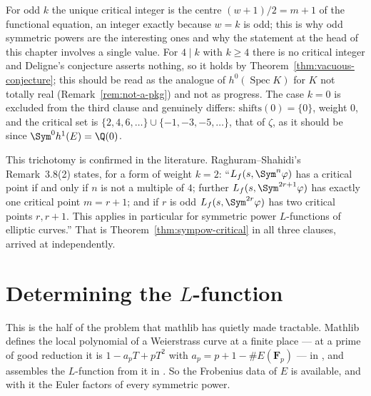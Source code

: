 \begin{remark}
  \label{rem:sympow-trichotomy}
  For odd $k$ the unique critical integer is the centre $(w+1)/2 = m+1$ of the functional
  equation, an integer exactly because $w=k$ is odd; this is why odd symmetric powers are the
  interesting ones and why the statement at the head of this chapter involves a single value.
  For $4 \mid k$ with $k \geq 4$ there is no critical integer and Deligne's conjecture asserts
  nothing, so it holds by Theorem~\ref{thm:vacuous-conjecture}; this should be read as the
  analogue of $h^{0}(\operatorname{Spec}K)$ for $K$ not totally real
  (Remark~\ref{rem:not-a-pkg}) and not as progress. The case $k=0$ is excluded from the
  third clause and genuinely differs: $\mathrm{shifts}(0)=\{0\}$, weight $0$, and the critical
  set is $\{2,4,6,\dots\}\cup\{-1,-3,-5,\dots\}$, that of $\zeta$, as it should be since
  $\Sym^{0}h^{1}(E) = \Q(0)$.

  This trichotomy is confirmed in the literature. Raghuram--Shahidi's Remark~3.8(2) states,
  for a form of weight $k=2$: ``$L_{f}(s,\Sym^{n}\varphi)$ has a critical point if and only if
  $n$ is not a multiple of $4$; further $L_{f}(s,\Sym^{2r+1}\varphi)$ has exactly one critical
  point $m=r+1$; and if $r$ is odd $L_{f}(s,\Sym^{2r}\varphi)$ has two critical points
  $r,r+1$. This applies in particular for symmetric power $L$-functions of elliptic curves.''
  That is Theorem~\ref{thm:sympow-critical} in all three clauses, arrived at independently.
\end{remark}

\section{Determining the \texorpdfstring{$L$}{L}-function}
\label{sec:sympow-L}

This is the half of the problem that mathlib has quietly made tractable. Mathlib defines the
local polynomial of a Weierstrass curve at a finite place --- at a prime of good reduction it
is $1 - a_{p}T + pT^{2}$ with $a_{p} = p + 1 - \#E(\mathbf{F}_{p})$ --- in
, and assembles the $L$-function from it in
. So the Frobenius data of $E$ is available, and with it the
Euler factors of every symmetric power.

